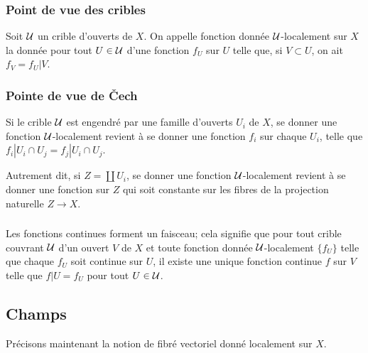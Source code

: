 \documentclass[oneside]{book}
\begin{document}
\subsubsection{Point de vue des cribles}\label{I:1-2-1}

Soit $\mathcal{U}$ un crible d'ouverts de $X$. On appelle fonction donnée 
$\mathcal{U}$-localement sur $X$ la donnée pour tout $U\in \mathcal{U}$ d'une fonction $f_U$ 
sur $U$ telle que, si $V\subset U$, on ait $f_V=f_U|V$. 





\subsubsection{Pointe de vue de Čech}\label{I:1-2-2}

Si le crible $\mathcal{U}$ est engendré par une famille d'ouverts $U_i$ de $X$, se 
donner une fonction $\mathcal{U}$-localement revient à se donner une fonction $f_i$ 
sur chaque $U_i$, telle que $f_i|{U_i\cap U_j} = f_j|{U_i\cap U_j}$. 

Autrement dit, si $Z=\coprod U_i$, se donner une fonction $\mathcal{U}$-localement 
revient à se donner une fonction sur $Z$ qui soit constante sur les fibres de 
la projection naturelle $Z\to X$. 





\subsubsection{}\label{I:1-2-3}

Les fonctions continues forment un faisceau; cela signifie que pour tout crible 
couvrant $\mathcal{U}$ d'un ouvert $V$ de $X$ et toute fonction donnée 
$\mathcal{U}$-localement $\{f_U\}$ telle que chaque $f_U$ soit continue sur $U$, il 
existe une unique fonction continue $f$ sur $V$ telle que $f|U=f_U$ pour tout 
$U\in \mathcal{U}$.










\subsection{Champs}\label{I:1-3}

Précisons maintenant la notion de fibré vectoriel donné localement sur $X$. 
\end{document}
